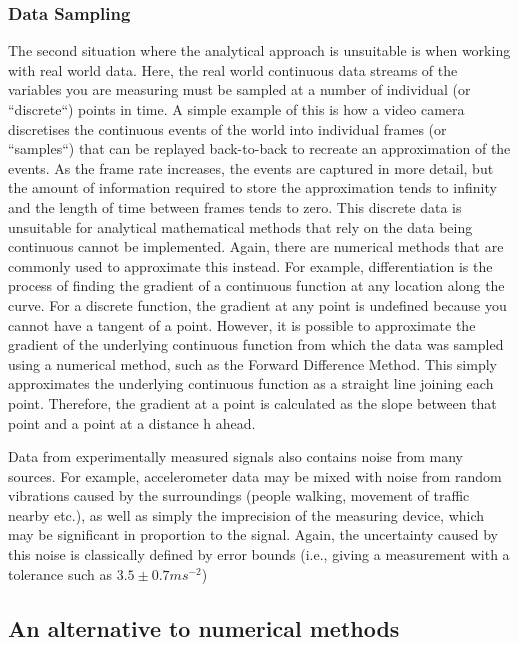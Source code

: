 \documentclass[12pt]{article}
\begin{document}
    \subsubsection{Data Sampling}
    The second situation where the analytical approach is unsuitable is when working with real world data.
    Here, the real world continuous data streams of the variables you are measuring must be sampled at a number of individual (or ``discrete``) points in time.
    A simple example of this is how a video camera discretises the continuous events of the world into individual frames (or ``samples``) that can be replayed back-to-back to recreate an approximation of the events.
    As the frame rate increases, the events are captured in more detail, but the amount of information required to store the approximation tends to infinity and the length of time between frames tends to zero.
    This discrete data is unsuitable for analytical mathematical methods that rely on the data being continuous cannot be implemented.
    Again, there are numerical methods that are commonly used to approximate this instead.
    For example, differentiation is the process of finding the gradient of a continuous function at any location along the curve.
    For a discrete function, the gradient at any point is undefined because you cannot have a tangent of a point.
    However, it is possible to approximate the gradient of the underlying continuous function from which the data was sampled using a numerical method, such as the Forward Difference Method.
    This simply approximates the underlying continuous function as a straight line joining each point.
    Therefore, the gradient at a point is calculated as the slope between that point and a point at a distance h ahead.

    Data from experimentally measured signals also contains noise from many sources.
    For example, accelerometer data may be mixed with noise from random vibrations caused by the surroundings (people walking, movement of traffic nearby etc.), as well as simply the imprecision of the measuring device, which may be significant in proportion to the signal.
    Again, the uncertainty caused by this noise is classically defined by error bounds (i.e., giving a measurement with a tolerance such as $3.5 \pm 0.7 ms^{-2}$)

    \subsection{An alternative to numerical methods}
\end{document}

